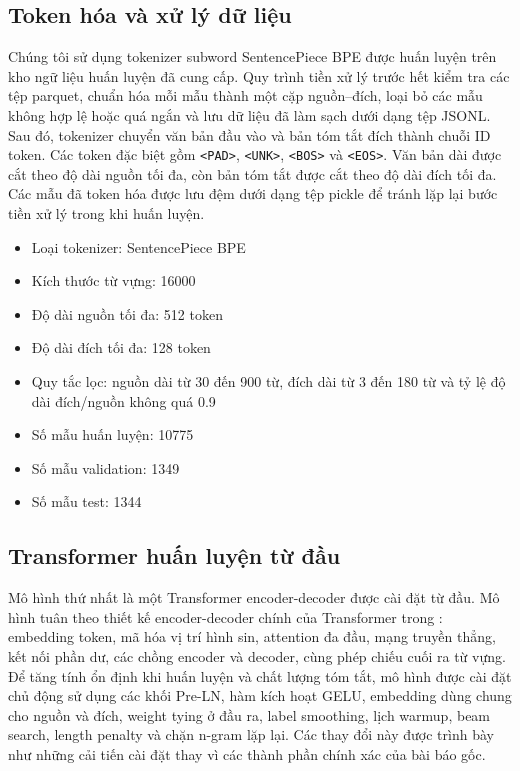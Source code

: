 \documentclass[conference]{IEEEtran}
\begin{document}
\subsection{Token hóa và xử lý dữ liệu}
Chúng tôi sử dụng tokenizer subword SentencePiece BPE được huấn luyện trên kho ngữ liệu huấn luyện đã cung cấp. Quy trình tiền xử lý trước hết kiểm tra các tệp parquet, chuẩn hóa mỗi mẫu thành một cặp nguồn--đích, loại bỏ các mẫu không hợp lệ hoặc quá ngắn và lưu dữ liệu đã làm sạch dưới dạng tệp JSONL. Sau đó, tokenizer chuyển văn bản đầu vào và bản tóm tắt đích thành chuỗi ID token. Các token đặc biệt gồm \texttt{<PAD>}, \texttt{<UNK>}, \texttt{<BOS>} và \texttt{<EOS>}. Văn bản dài được cắt theo độ dài nguồn tối đa, còn bản tóm tắt được cắt theo độ dài đích tối đa. Các mẫu đã token hóa được lưu đệm dưới dạng tệp pickle để tránh lặp lại bước tiền xử lý trong khi huấn luyện.

\begin{itemize}
    \item Loại tokenizer: SentencePiece BPE
    \item Kích thước từ vựng: 16000
    \item Độ dài nguồn tối đa: 512 token
    \item Độ dài đích tối đa: 128 token
    \item Quy tắc lọc: nguồn dài từ 30 đến 900 từ, đích dài từ 3 đến 180 từ và tỷ lệ độ dài đích/nguồn không quá 0.9
    \item Số mẫu huấn luyện: 10775
    \item Số mẫu validation: 1349
    \item Số mẫu test: 1344
\end{itemize}

\subsection{Transformer huấn luyện từ đầu}
Mô hình thứ nhất là một Transformer encoder-decoder được cài đặt từ đầu. Mô hình tuân theo thiết kế encoder-decoder chính của Transformer trong \cite{vaswani2017attention}: embedding token, mã hóa vị trí hình sin, attention đa đầu, mạng truyền thẳng, kết nối phần dư, các chồng encoder và decoder, cùng phép chiếu cuối ra từ vựng. Để tăng tính ổn định khi huấn luyện và chất lượng tóm tắt, mô hình được cài đặt chủ động sử dụng các khối Pre-LN, hàm kích hoạt GELU, embedding dùng chung cho nguồn và đích, weight tying ở đầu ra, label smoothing, lịch warmup, beam search, length penalty và chặn n-gram lặp lại. Các thay đổi này được trình bày như những cải tiến cài đặt thay vì các thành phần chính xác của bài báo gốc.
\end{document}
